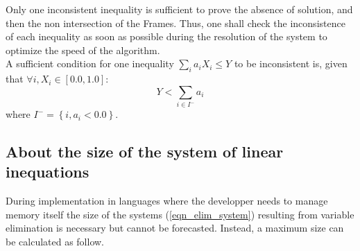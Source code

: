 \documentclass[12pt, a4paper]{article}
\begin{document}
Only one inconsistent inequality is sufficient to prove the absence of solution, and then the non intersection of the Frames. Thus, one shall check the inconsistence of each inequality as soon as possible during the resolution of the system to optimize the speed of the algorithm.\\

A sufficient condition for one inequality $\sum_ia_iX_i\le Y$ to be inconsistent is, given that $\forall i,X_i\in[0.0,1.0]$:
\begin{equation}
\label{cond_non_intersec}
Y<\sum_{i\in I^-}a_i
\end{equation}
where $I^-=\left\lbrace i, a_i<0.0\right\rbrace$.\\

\subsection{About the size of the system of linear inequations}

During implementation in languages where the developper needs to manage memory itself the size of the systems (\ref{eqn_elim_system}) resulting from variable elimination is necessary but cannot be forecasted. Instead, a maximum size can be calculated as follow.\\
\end{document}
